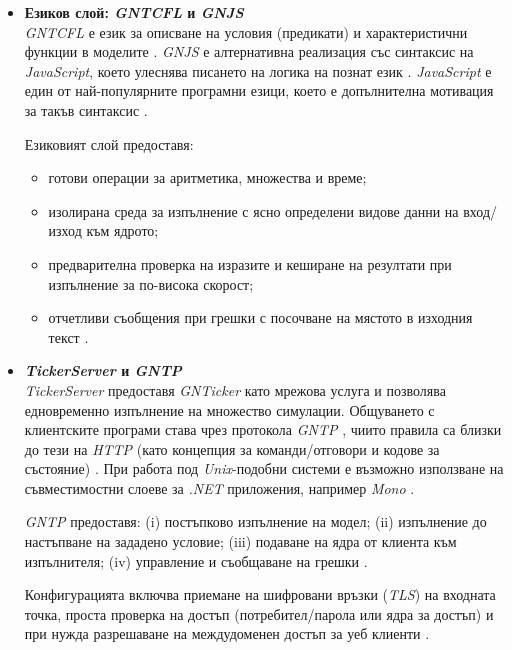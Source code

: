 \begin{itemize}
\begin{itemize}[itemsep=0.5em]
	
	
	\item \textbf{Езиков слой: \textit{GNTCFL} и \textit{GNJS}}\\
    \textit{GNTCFL} е език за описване на условия (предикати) и характеристични функции в моделите \cite{Trifonov2008}. \textit{GNJS} е алтернативна реализация със синтаксис на \textit{JavaScript}, което улеснява писането на логика на познат език \cite{Trifonov2008}. \textit{JavaScript} е един от най-популярните програмни езици, което е допълнителна мотивация за такъв синтаксис \cite{LangPop}.	

	Езиковият слой предоставя:
	\begin{itemize}[itemsep=0.25em]
		\item готови операции за аритметика, множества и време;
		\item изолирана среда за изпълнение с ясно определени видове данни на вход/изход към ядрото;
		\item предварителна проверка на изразите и кеширане на резултати при изпълнение за по-висока скорост;
		\item отчетливи съобщения при грешки с посочване на мястото в изходния текст \cite{Trifonov2008}.
	\end{itemize}	
		
	
	\item \textbf{\textit{TickerServer} и \textit{GNTP}}\\
	\textit{TickerServer} предоставя \textit{GNTicker} като мрежова услуга и позволява едновременно изпълнение на множество симулации. Общуването с клиентските програми става чрез протокола \textit{GNTP} \cite{GNTickerProtocol}, чиито правила са близки до тези на \textit{HTTP} (като концепция за команди/отговори и кодове за състояние) \cite{Trifonov2008}. При работа под \textit{Unix}-подобни системи е възможно използване на съвместимостни слоеве за \textit{.NET} приложения, например \textit{Mono} \cite{Mono}.
	
    \textit{GNTP} предоставя: (i) постъпково изпълнение на модел; (ii) изпълнение до настъпване на зададено условие; (iii) подаване на ядра от клиента към изпълнителя; (iv) управление и съобщаване на грешки \cite{Trifonov2008,GNTickerProtocol}.
	
	Конфигурацията включва приемане на шифровани връзки (\textit{TLS}) на входната точка, проста проверка на достъп (потребител/парола или ядра за достъп) и при нужда разрешаване на междудоменен достъп за уеб клиенти \cite{Dimitrov2011,GNTickerProtocol}.



\end{itemize}
\end{itemize}
